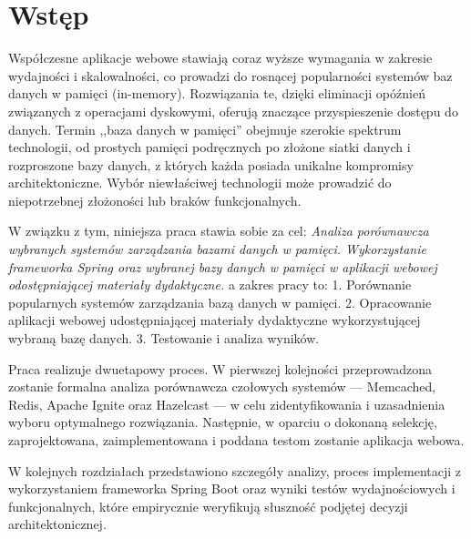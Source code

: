 %


\chapter*{Wstęp}


Współczesne aplikacje webowe stawiają coraz wyższe wymagania w zakresie wydajności i skalowalności, co prowadzi do rosnącej popularności systemów baz danych w pamięci (in-memory). Rozwiązania te, dzięki eliminacji opóźnień związanych z operacjami dyskowymi, oferują znaczące przyspieszenie dostępu do danych. Termin ,,baza danych w pamięci'' obejmuje  szerokie spektrum technologii, od prostych pamięci podręcznych po złożone siatki danych i rozproszone bazy danych, z których każda posiada unikalne kompromisy architektoniczne. Wybór niewłaściwej technologii może prowadzić do niepotrzebnej złożoności lub braków funkcjonalnych.

W związku z tym, niniejsza praca stawia sobie za cel:  \textit{Analiza porównawcza wybranych systemów zarządzania bazami danych w pamięci. Wykorzystanie frameworka Spring oraz wybranej bazy danych w pamięci w aplikacji webowej odostępniającej materiały dydaktyczne.} a zakres pracy to:
1. Porównanie popularnych systemów zarządzania bazą danych w pamięci.
2. Opracowanie aplikacji webowej udostępniającej materiały dydaktyczne wykorzystującej wybraną bazę danych.
3. Testowanie i analiza wyników.

Praca realizuje dwuetapowy proces. W pierwszej kolejności przeprowadzona zostanie formalna analiza porównawcza czołowych systemów — Memcached, Redis, Apache Ignite oraz Hazelcast — w celu zidentyfikowania i uzasadnienia wyboru optymalnego rozwiązania. Następnie, w oparciu o dokonaną selekcję, zaprojektowana, zaimplementowana i poddana testom zostanie aplikacja webowa.

W kolejnych rozdziałach przedstawiono szczegóły analizy, proces implementacji z wykorzystaniem frameworka Spring Boot oraz wyniki testów wydajnościowych i funkcjonalnych, które empirycznie weryfikują słuszność podjętej decyzji architektonicznej.
